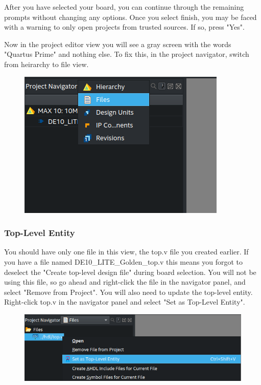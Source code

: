 \documentclass[12pt]{labmanual}
\begin{document}
After you have selected your board, you can continue through the remaining prompts without changing any options. Once you select finish, you may be faced with a warning to only open projects from trusted sources. If so, press "Yes".

Now in the project editor view you will see a gray screen with the words "Quartus Prime" and nothing else. To fix this, in the project navigator, switch from heirarchy to file view.

\begin{figure}[H]
    \centering
    \includegraphics[width=0.5\linewidth]{project_nav.png}
\end{figure}

\subsubsection{Top-Level Entity}

You should have only one file in this view, the top.v file you created earlier. If you have a file named DE10\_LITE\_Golden\_top.v this means you forgot to deselect the "Create top-level design file" during board selection. You will not be using this file, so go ahead and right-click the file in the navigator panel, and select "Remove from Project". You will also need to update the top-level entity. Right-click top.v in the navigator panel and select "Set as Top-Level Entity".

\begin{figure}[H]
    \centering
    \includegraphics[width=\linewidth]{toplevel.png}
\end{figure}
\end{document}
